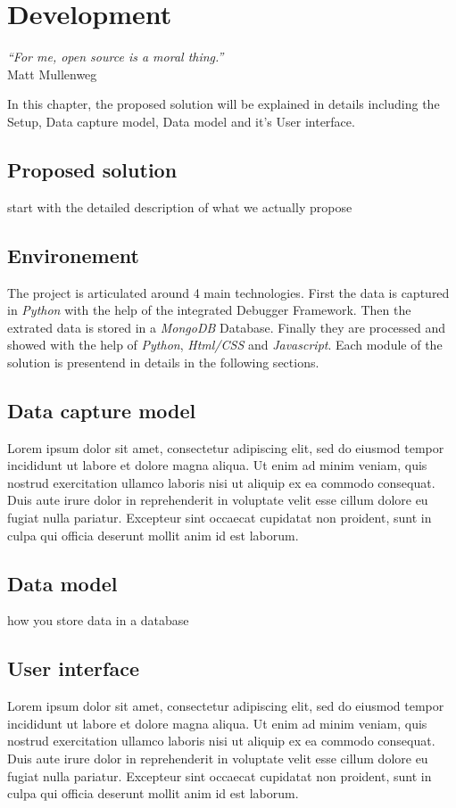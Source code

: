 
\chapter{Development} %
\label{chap:development}
\begin{flushright}
\textit{``For me, open source is a moral thing.''} \\ Matt Mullenweg
\end{flushright}

In this chapter, the proposed solution will be explained in details including the Setup, Data capture model, Data model and it's User interface.


\section{Proposed solution}
start with the detailed description of what we actually propose

\section{Environement}
The project is articulated around 4 main technologies. First the data is captured in \textit{Python} with the help of the integrated Debugger Framework. Then the extrated data is stored in a \textit{MongoDB} Database. Finally they are processed and showed with the help of \textit{Python}, \textit{Html/CSS} and \textit{Javascript}. Each module of the solution is presentend in details in the following sections. 

\section{Data capture model}
Lorem ipsum dolor sit amet, consectetur adipiscing elit, sed do eiusmod tempor incididunt ut labore et dolore magna aliqua. Ut enim ad minim veniam, quis nostrud exercitation ullamco laboris nisi ut aliquip ex ea commodo consequat. Duis aute irure dolor in reprehenderit in voluptate velit esse cillum dolore eu fugiat nulla pariatur. Excepteur sint occaecat cupidatat non proident, sunt in culpa qui officia deserunt mollit anim id est laborum.

\section{Data model}
how you store data in a database

\section{User interface}
Lorem ipsum dolor sit amet, consectetur adipiscing elit, sed do eiusmod tempor incididunt ut labore et dolore magna aliqua. Ut enim ad minim veniam, quis nostrud exercitation ullamco laboris nisi ut aliquip ex ea commodo consequat. Duis aute irure dolor in reprehenderit in voluptate velit esse cillum dolore eu fugiat nulla pariatur. Excepteur sint occaecat cupidatat non proident, sunt in culpa qui officia deserunt mollit anim id est laborum.

